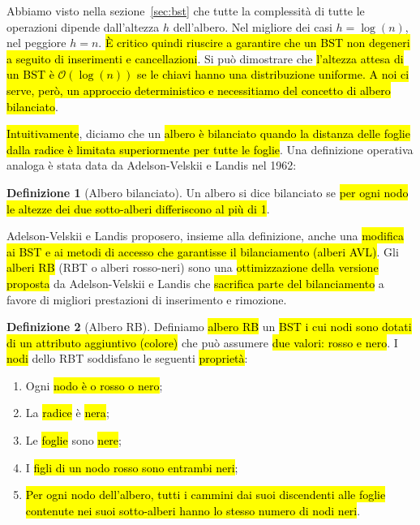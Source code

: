 \documentclass[a4paper,11pt,oneside]{article}
\theoremstyle{plain}
\theoremstyle{definition}
\newtheorem{defn}{Definizione}[section]
\theoremstyle{remark}
\begin{document}
Abbiamo visto nella sezione~\ref{sec:bst} che tutte la complessità di tutte le
operazioni dipende dall'altezza $h$ dell'albero. Nel migliore dei casi $h =
\log(n)$, nel peggiore $h = n$. \hl{È critico quindi riuscire a garantire che un
BST non degeneri a seguito di inserimenti e cancellazioni}. Si può dimostrare
che \hl{l'altezza attesa di un BST è $\mathcal{O}(\log(n))$ se le chiavi hanno
una distribuzione uniforme. A noi ci serve, però, un approccio deterministico e
necessitiamo del concetto di albero bilanciato}.

\hl{Intuitivamente}, diciamo che un \hl{albero è bilanciato quando la distanza
delle foglie dalla radice è limitata superiormente per tutte le foglie}. Una
definizione operativa analoga è stata data da Adelson-Velskii e Landis nel 1962:

\begin{defn}[Albero bilanciato]\label{def:balanced-tree}
  Un albero si dice bilanciato se \hl{per ogni nodo le altezze dei due
  sotto-alberi differiscono al più di 1}.
\end{defn}

Adelson-Velskii e Landis proposero, insieme alla definizione, anche una
\hl{modifica ai BST e ai metodi di accesso che garantisse il bilanciamento
(alberi AVL)}. Gli \hl{alberi RB} (RBT o alberi rosso-neri) sono una
\hl{ottimizzazione della versione proposta} da Adelson-Velskii e Landis che
\hl{sacrifica parte del bilanciamento} a favore di migliori prestazioni di
inserimento e rimozione.

\begin{defn}[Albero RB]\label{def:rbt}
  Definiamo \hl{albero RB} un \hl{BST i cui nodi sono dotati di un attributo aggiuntivo
  (colore)} che può assumere \hl{due valori: rosso e nero}. I \hl{nodi} dello RBT
  soddisfano le seguenti \hl{proprietà}:

  \begin{enumerate}
    \item Ogni \hl{nodo è o rosso o nero};
    \item La \hl{radice} è \hl{nera};
    \item Le \hl{foglie} sono \hl{nere};
    \item I \hl{figli di un nodo rosso sono entrambi neri};
    \item \hl{Per ogni nodo dell'albero, tutti i cammini dai suoi discendenti
      alle foglie contenute nei suoi sotto-alberi hanno lo stesso numero di nodi
      neri}.
  \end{enumerate}
\end{defn}
\end{document}

